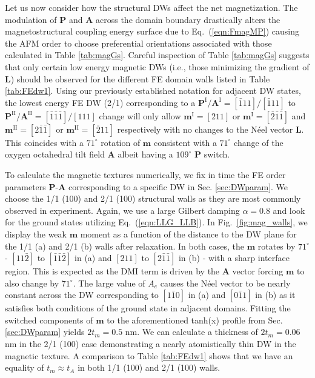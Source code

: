 \documentclass[%
 reprint,
superscriptaddress,
 amsmath,amssymb,
prb,
]{revtex4-1}
\begin{document}
%
Let us now consider how the structural DWs affect the net magnetization.
%
The modulation of $\mathbf{P}$ and $\mathbf{A}$ across the domain boundary drastically alters the magnetostructural coupling energy surface due to Eq.~(\ref{eqn:FmagMP}) causing the AFM order to choose preferential orientations associated with those calculated in Table \ref{tab:magGs}.
%
Careful inspection of Table \ref{tab:magGs} suggests that only certain low energy magnetic DWs (i.e., those minimizing the gradient of $\mathbf{L}$) should be observed for the different FE domain walls listed in Table \ref{tab:FEdw1}.
%
Using our previously established notation for adjacent DW states, the lowest energy FE DW (2/1) corresponding to a $\mathbf{P}^\mathrm{I}/\mathbf{A}^\mathrm{I} = [\bar{1}11]/[\bar{1}11]$ to $\mathbf{P}^\mathrm{II}/\mathbf{A}^\mathrm{II} = [\bar{1}\bar{1}\bar{1}]/[111]$ change will only allow $\mathbf{m}^\mathrm{I} = [211]$ or $\mathbf{m}^\mathrm{I} = [\bar{2}\bar{1}\bar{1}]$ and $\mathbf{m}^\mathrm{II} = [2\bar{1}\bar{1}]$ or $\mathbf{m}^\mathrm{II} = [\bar{2}11]$ respectively with no changes to the Néel vector $\mathbf{L}$.
%
This coincides with a $71^\circ$ rotation of $\mathbf{m}$ consistent with a $71^\circ$ change of the oxygen octahedral tilt field $\mathbf{A}$ albeit having a $109^\circ$ $\mathbf{P}$ switch.
%


%
%


%
To calculate the magnetic textures numerically, we fix in time the FE order parameters $\mathbf{P}$-$\mathbf{A}$ corresponding to a specific DW in Sec. \ref{sec:DWparam}.
%
We choose the 1/1 (100) and 2/1 (100) structural walls as they are most commonly observed in experiment.
%
Again, we use a large Gilbert damping $\alpha = 0.8$ and look for the ground states utilizing Eq.~(\ref{eqn:LLG_LLB}).
%
%
In Fig.~\ref{fig:mag_walls}, we display the weak $\mathbf{m}$ moment as a function of the distance to the DW plane for the 1/1 (a) and 2/1 (b) walls after relaxation.
%
In both cases, the $\mathbf{m}$ rotates by $71^\circ$ - $[11\bar{2}]$ to $[\bar{1}\bar{1}\bar{2}]$ in (a) and $[211]$ to $[2\bar{1}\bar{1}]$ in (b) - with a sharp interface region.  
%
This is expected as the DMI term is driven by the $\mathbf{A}$ vector forcing $\mathbf{m}$ to also change by $71^\circ$.
%
The large value of $A_e$ causes the N\'{e}el vector to be nearly constant across the DW corresponding to $[1\bar{1}0]$ in (a) and $[0\bar{1}1]$ in (b) as it satisfies both conditions of the ground state in adjacent domains. 
%
Fitting the switched components of $\mathbf{m}$ to the aforementioned tanh(x) profile from Sec. \ref{sec:DWparam} yields $2 t_m = 0.5$ nm. 
%
We can calculate a thickness of $2 t_m = 0.06$ nm in the 2/1 (100) case demonstrating a nearly atomistically thin DW in the magnetic texture.
%
A comparison to Table \ref{tab:FEdw1} shows that we have an equality of $t_m \approx t_A$ in both 1/1 (100) and 2/1 (100) walls.
%
%
\end{document}
